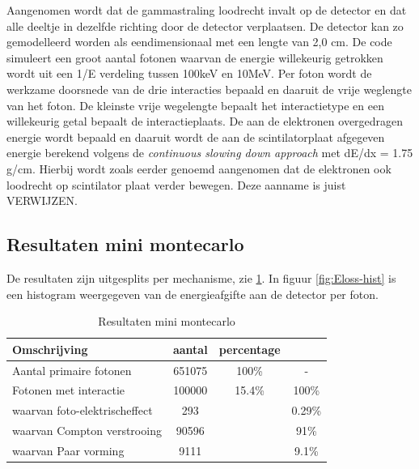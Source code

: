 \documentclass[a4paper,11pt]{article}
\begin{document}
Aangenomen wordt dat de gammastraling loodrecht invalt op de detector en dat alle deeltje in dezelfde richting door de detector verplaatsen. De detector kan zo gemodelleerd worden als eendimensionaal met een lengte van 2,0 cm. De code simuleert een groot aantal fotonen waarvan de energie willekeurig getrokken wordt uit een 1/E verdeling tussen 100keV en 10MeV. Per foton wordt de werkzame doorsnede van de drie interacties bepaald en daaruit de vrije weglengte van het foton. De kleinste vrije wegelengte bepaalt het interactietype en een willekeurig getal bepaalt de interactieplaats. De aan de elektronen overgedragen energie wordt bepaald en daaruit wordt de aan de scintilatorplaat afgegeven energie berekend volgens de \textit{continuous slowing down approach} met dE/dx = 1.75 g/cm. Hierbij wordt zoals eerder genoemd aangenomen dat de elektronen ook loodrecht op scintilator plaat verder bewegen. Deze aanname is juist VERWIJZEN.

\subsection{Resultaten mini montecarlo}

De resultaten zijn uitgesplits per mechanisme, zie \ref{table:mmc-mechanisme}.
In figuur \ref{fig:Eloss-hist} is een histogram weergegeven van de energieafgifte aan de detector per foton.

\begin{table}[ht]
\caption{Resultaten mini montecarlo}
\centering
\begin{tabular}{l c c c} %
\hline\hline
Omschrijving & aantal & percentage \\ [0.5ex] %
\hline %
Aantal primaire fotonen & 651075 & 100\% & - \\ %
Fotonen met interactie & 100000 & 15.4\% & 100\% \\
waarvan foto-elektrischeffect & 293 & & 0.29\% \\
waarvan Compton verstrooing & 90596 & & 91\% \\
waarvan Paar vorming & 9111 & & 9.1\% \\ [1ex] %
\hline %
\end{tabular}
\label{table:mmc-mechanisme} %
\end{table}
\end{document}
